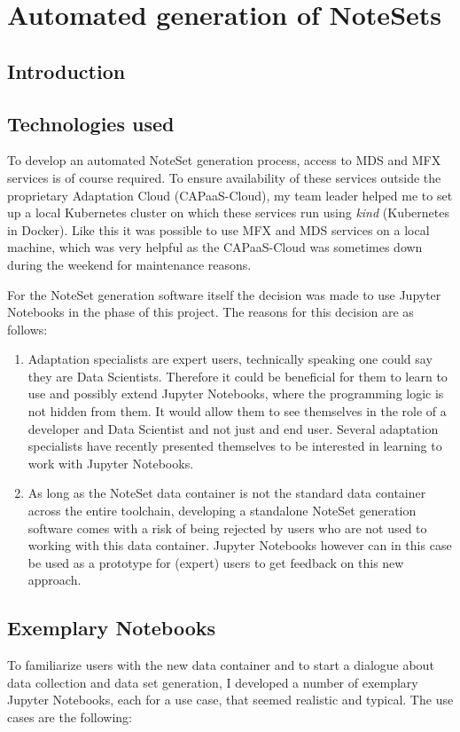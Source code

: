 \chapter{ Automated generation of NoteSets}
\label{chap:nsgeneration}

\section{Introduction}
\section{Technologies used}
To develop an automated NoteSet generation process, access to MDS and MFX services is of course required. To ensure availability of these services outside the proprietary Adaptation Cloud (CAPaaS-Cloud), my team leader helped me to set up a local Kubernetes cluster on which these services run using \emph{kind} (Kubernetes in Docker). Like this it was possible to use MFX and MDS services on a local machine, which was very helpful as the CAPaaS-Cloud was sometimes down during the weekend for maintenance reasons.\par
For the NoteSet generation software itself the decision was made to use Jupyter Notebooks in the phase of this project. The reasons for this decision are as follows:
\begin{enumerate}
  \item Adaptation specialists are expert users, technically speaking one could say they are Data Scientists. Therefore it could be beneficial for them to learn to use and possibly extend Jupyter Notebooks, where the programming logic is not hidden from them. It would allow them to see themselves in the role of a developer and Data Scientist and not just and end user. Several adaptation specialists have recently presented themselves to be interested in learning to work with Jupyter Notebooks.
  \item As long as the NoteSet data container is not the standard data container across the entire toolchain, developing a standalone NoteSet generation software comes with a risk of being rejected by users who are not used to working with this data container. Jupyter Notebooks however can in this case be used as a prototype for (expert) users to get feedback on this new approach.
\end{enumerate}
\section{Exemplary Notebooks}
To familiarize users with the new data container and to start a dialogue about data collection and  data set generation, I developed a number of exemplary Jupyter Notebooks, each for a use case, that seemed realistic and typical. The use cases are the following:
